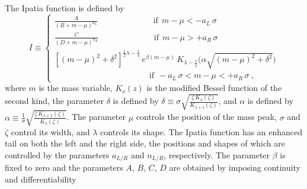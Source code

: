 The Ipatia function is defined by
\begin{equation}
  I \equiv
  \begin{cases}
    \frac{A}{(B + m-\mu)^{n_L}} \qquad\qquad\qquad\ \ \ \text{if}\ \ m - \mu < -a_L\,\sigma \\
    \frac{C}{(D + m-\mu)^{n_R}} \qquad\qquad\qquad\ \ \ \text{if}\ \ m - \mu > +a_R\,\sigma \\
    \left[(m-\mu)^{2} + \delta^{2}\right]^{\frac{1}{2} \lambda - \frac{1}{4}}\, e^{\beta (m-\mu)}\,
          K_{\lambda - \frac{1}{2}}\big(\alpha \sqrt{(m-\mu)^2 + \delta^2}\big) \\
          \qquad\qquad\qquad\qquad\qquad\quad\ \ \text{if}\ \ -a_L\,\sigma < m - \mu < +a_R\,\sigma \ ,
  \end{cases}
\end{equation}
where $m$ is the mass variable, $K_{\nu}(z)$ is the modified Bessel function of the second kind, the parameter $\delta$ is defined by
$\delta\equiv\sigma\sqrt{\frac{\zeta\,K_\lambda(\zeta)}{K_{\lambda+1}(\zeta)}}$, and $\alpha$ is defined by
$\alpha\equiv\frac{1}{\sigma}\sqrt{\frac{\zeta\, K_{\lambda+1}(\zeta)}{K_\lambda(\zeta)}}$. The parameter $\mu$ controls the position of
the mass peak, $\sigma$ and $\zeta$ control its width, and $\lambda$ controls its shape. The Ipatia function has an enhanced tail on both
the left and the right side, the positions and shapes of which are controlled by the parameters $a_{L/R}$ and $n_{L/R}$, respectively. The
parameter $\beta$ is fixed to zero and the parameters $A$, $B$, $C$, $D$ are obtained by imposing continuity and differentiability

